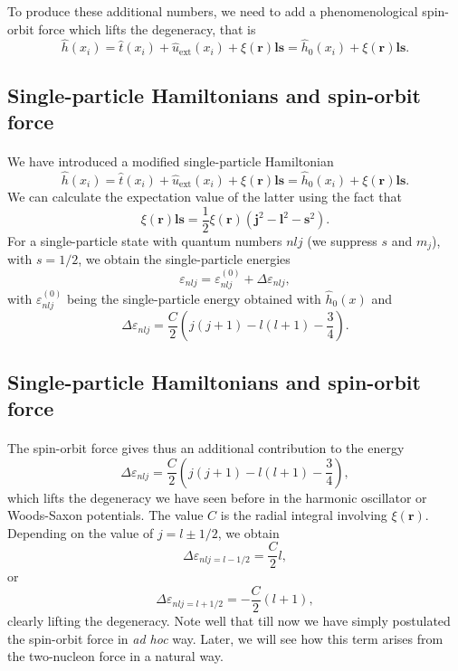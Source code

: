 \documentclass[%
twoside,                 %
final,                   %
10pt]{article}
\begin{document}
To produce these additional numbers, we need to add a phenomenological spin-orbit force which lifts the degeneracy, that is
\[
\hat{h}(x_i) =  \hat{t}(x_i) + \hat{u}_{\mathrm{ext}}(x_i) +\xi(\bm{r})\bm{ls}=\hat{h}_0(x_i)+\xi(\bm{r})\bm{ls}. 
\]



\subsection*{Single-particle Hamiltonians and spin-orbit force}

\paragraph{}
We have introduced a modified single-particle Hamiltonian
\[
\hat{h}(x_i) =  \hat{t}(x_i) + \hat{u}_{\mathrm{ext}}(x_i) +\xi(\bm{r})\bm{ls}=\hat{h}_0(x_i)+\xi(\bm{r})\bm{ls}. 
\]
We can calculate the expectation value of the latter using the fact that
\[
\xi(\bm{r})\bm{ls}=\frac{1}{2}\xi(\bm{r})\left(\bm{j}^2-\bm{l}^2-\bm{s}^2\right).
\]
For a single-particle state with quantum numbers $nlj$ (we suppress $s$ and $m_j$), with $s=1/2$, we obtain the single-particle energies
\[
\varepsilon_{nlj} = \varepsilon_{nlj}^{(0)}+\Delta\varepsilon_{nlj}, 
\]
with $\varepsilon_{nlj}^{(0)}$ being the single-particle energy obtained with $\hat{h}_0(x)$ and
\[
\Delta\varepsilon_{nlj}=\frac{C}{2}\left(j(j+1)-l(l+1)-\frac{3}{4}\right).
\]



\subsection*{Single-particle Hamiltonians and spin-orbit force}

\paragraph{}
The spin-orbit force gives thus an additional contribution to the energy
\[
\Delta\varepsilon_{nlj}=\frac{C}{2}\left(j(j+1)-l(l+1)-\frac{3}{4}\right),
\]
which lifts the degeneracy we have seen before in the harmonic oscillator or Woods-Saxon potentials. The value $C$ is the radial
integral involving $\xi(\bm{r})$. Depending on the value of $j=l\pm 1/2$, we obtain 
\[
\Delta\varepsilon_{nlj=l-1/2}=\frac{C}{2}l,
\]
or
\[
\Delta\varepsilon_{nlj=l+1/2}=-\frac{C}{2}(l+1),
\]
clearly lifting the degeneracy. Note well that till now we have simply postulated the spin-orbit force in \emph{ad hoc} way.
Later, we will see how this term arises from the two-nucleon force in a natural way.
\end{document}
